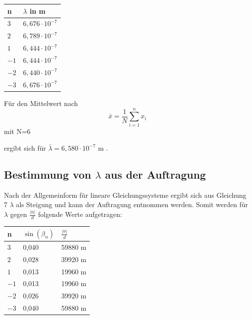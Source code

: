 \documentclass[12pt,a4paper,titlepage,headinclude,bibtotoc]{scrartcl}
\begin{document}
\begin{table} [h]
\centering
\begin{tabular}{|p{4 cm}||p{4 cm}|}
        \hline
		n& $\lambda$ in m\\
         \hline 
         $3$ & $6,676\cdot10^{-7}$  \\
         \hline
         $2$ & $6,789\cdot10^{-7}$\\
         \hline
         $1$ & $6,444\cdot10^{-7}$ \\
         \hline
         $-1$ & $6,444\cdot10^{-7}$ \\
         \hline
         $-2$ & $6,440\cdot10^{-7}$ \\
         \hline             
         $-3$ & $6,676\cdot10^{-7}$ \\
         \hline
\end{tabular}
\end{table}

Für den Mittelwert nach
\[\bar{x} =\frac{1}{N}\sum_{i=1}^n x_i\] mit N=6

ergibt sich für $\bar{\lambda} = 6,580\cdot10^{-7}$ m .


\subsection{Bestimmung von $\lambda$ aus der Auftragung}



Nach der Allgemeinform für lineare Gleichungssysteme ergibt sich aus Gleichung 7 $\lambda$ als Steigung und kann der Auftragung entnommen werden. Somit werden für ${\lambda}$ gegen $\frac{|n|}{d}$ folgende Werte aufgetragen:\\

\begin{table} [h]
\centering
\begin{tabular}{|p{4 cm}||p{4 cm}|p{4 cm}|}
        \hline
		n & $\sin(\beta_n)$ & $\frac{|n|}{d}$\\
         \hline 
         $3$ & 0,040 & 59880 m  \\
         \hline
         $2$ & 0,028 & 39920 m \\
         \hline
         $1$ & 0,013 & 19960 m\\
         \hline
         $-1$ & 0,013 &  19960 m  \\
         \hline
         $-2$ & 0,026 & 39920 m  \\
         \hline             
         $-3$ & 0,040 & 59880 m  \\
         \hline
\end{tabular}
\end{table}
\end{document}
